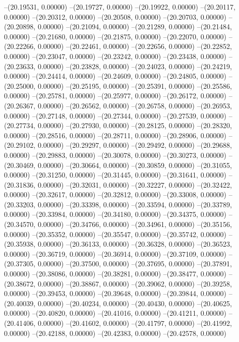 --(20.19531, 0.00000)
--(20.19727, 0.00000)
--(20.19922, 0.00000)
--(20.20117, 0.00000)
--(20.20312, 0.00000)
--(20.20508, 0.00000)
--(20.20703, 0.00000)
--(20.20898, 0.00000)
--(20.21094, 0.00000)
--(20.21289, 0.00000)
--(20.21484, 0.00000)
--(20.21680, 0.00000)
--(20.21875, 0.00000)
--(20.22070, 0.00000)
--(20.22266, 0.00000)
--(20.22461, 0.00000)
--(20.22656, 0.00000)
--(20.22852, 0.00000)
--(20.23047, 0.00000)
--(20.23242, 0.00000)
--(20.23438, 0.00000)
--(20.23633, 0.00000)
--(20.23828, 0.00000)
--(20.24023, 0.00000)
--(20.24219, 0.00000)
--(20.24414, 0.00000)
--(20.24609, 0.00000)
--(20.24805, 0.00000)
--(20.25000, 0.00000)
--(20.25195, 0.00000)
--(20.25391, 0.00000)
--(20.25586, 0.00000)
--(20.25781, 0.00000)
--(20.25977, 0.00000)
--(20.26172, 0.00000)
--(20.26367, 0.00000)
--(20.26562, 0.00000)
--(20.26758, 0.00000)
--(20.26953, 0.00000)
--(20.27148, 0.00000)
--(20.27344, 0.00000)
--(20.27539, 0.00000)
--(20.27734, 0.00000)
--(20.27930, 0.00000)
--(20.28125, 0.00000)
--(20.28320, 0.00000)
--(20.28516, 0.00000)
--(20.28711, 0.00000)
--(20.28906, 0.00000)
--(20.29102, 0.00000)
--(20.29297, 0.00000)
--(20.29492, 0.00000)
--(20.29688, 0.00000)
--(20.29883, 0.00000)
--(20.30078, 0.00000)
--(20.30273, 0.00000)
--(20.30469, 0.00000)
--(20.30664, 0.00000)
--(20.30859, 0.00000)
--(20.31055, 0.00000)
--(20.31250, 0.00000)
--(20.31445, 0.00000)
--(20.31641, 0.00000)
--(20.31836, 0.00000)
--(20.32031, 0.00000)
--(20.32227, 0.00000)
--(20.32422, 0.00000)
--(20.32617, 0.00000)
--(20.32812, 0.00000)
--(20.33008, 0.00000)
--(20.33203, 0.00000)
--(20.33398, 0.00000)
--(20.33594, 0.00000)
--(20.33789, 0.00000)
--(20.33984, 0.00000)
--(20.34180, 0.00000)
--(20.34375, 0.00000)
--(20.34570, 0.00000)
--(20.34766, 0.00000)
--(20.34961, 0.00000)
--(20.35156, 0.00000)
--(20.35352, 0.00000)
--(20.35547, 0.00000)
--(20.35742, 0.00000)
--(20.35938, 0.00000)
--(20.36133, 0.00000)
--(20.36328, 0.00000)
--(20.36523, 0.00000)
--(20.36719, 0.00000)
--(20.36914, 0.00000)
--(20.37109, 0.00000)
--(20.37305, 0.00000)
--(20.37500, 0.00000)
--(20.37695, 0.00000)
--(20.37891, 0.00000)
--(20.38086, 0.00000)
--(20.38281, 0.00000)
--(20.38477, 0.00000)
--(20.38672, 0.00000)
--(20.38867, 0.00000)
--(20.39062, 0.00000)
--(20.39258, 0.00000)
--(20.39453, 0.00000)
--(20.39648, 0.00000)
--(20.39844, 0.00000)
--(20.40039, 0.00000)
--(20.40234, 0.00000)
--(20.40430, 0.00000)
--(20.40625, 0.00000)
--(20.40820, 0.00000)
--(20.41016, 0.00000)
--(20.41211, 0.00000)
--(20.41406, 0.00000)
--(20.41602, 0.00000)
--(20.41797, 0.00000)
--(20.41992, 0.00000)
--(20.42188, 0.00000)
--(20.42383, 0.00000)
--(20.42578, 0.00000)
